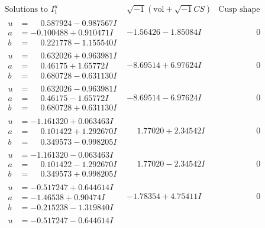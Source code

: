 \documentclass[1p]{elsarticle_modified}
\theoremstyle{definition}
\newcommand{\I}{\sqrt{-1}}
\begin{document}
$$\begin{array}{c|c|c}
\text{Solutions to }I^u_{1}& \I (\text{vol} + \sqrt{-1}CS) & \text{Cusp shape}\\
 \hline 
\begin{aligned}
u &= \phantom{-}0.587924 - 0.987567 I \\
a &= -0.100488 + 0.910471 I \\
b &= \phantom{-}0.221778 - 1.155540 I\end{aligned}
 & -1.56426 - 1.85084 I & \phantom{-0.000000 } 0 \\ \hline\begin{aligned}
u &= \phantom{-}0.632026 + 0.963981 I \\
a &= \phantom{-}0.46175 + 1.65772 I \\
b &= \phantom{-}0.680728 - 0.631130 I\end{aligned}
 & -8.69514 + 6.97624 I & \phantom{-0.000000 } 0 \\ \hline\begin{aligned}
u &= \phantom{-}0.632026 - 0.963981 I \\
a &= \phantom{-}0.46175 - 1.65772 I \\
b &= \phantom{-}0.680728 + 0.631130 I\end{aligned}
 & -8.69514 - 6.97624 I & \phantom{-0.000000 } 0 \\ \hline\begin{aligned}
u &= -1.161320 + 0.063463 I \\
a &= \phantom{-}0.101422 + 1.292670 I \\
b &= \phantom{-}0.349573 - 0.998205 I\end{aligned}
 & \phantom{-}1.77020 + 2.34542 I & \phantom{-0.000000 } 0 \\ \hline\begin{aligned}
u &= -1.161320 - 0.063463 I \\
a &= \phantom{-}0.101422 - 1.292670 I \\
b &= \phantom{-}0.349573 + 0.998205 I\end{aligned}
 & \phantom{-}1.77020 - 2.34542 I & \phantom{-0.000000 } 0 \\ \hline\begin{aligned}
u &= -0.517247 + 0.644614 I \\
a &= -1.46538 + 0.90474 I \\
b &= -0.215238 - 1.319840 I\end{aligned}
 & -1.78354 + 4.75411 I & \phantom{-0.000000 } 0 \\ \hline\begin{aligned}
u &= -0.517247 - 0.644614 I \\

\end{aligned}
\end{array}$$
\end{document}
